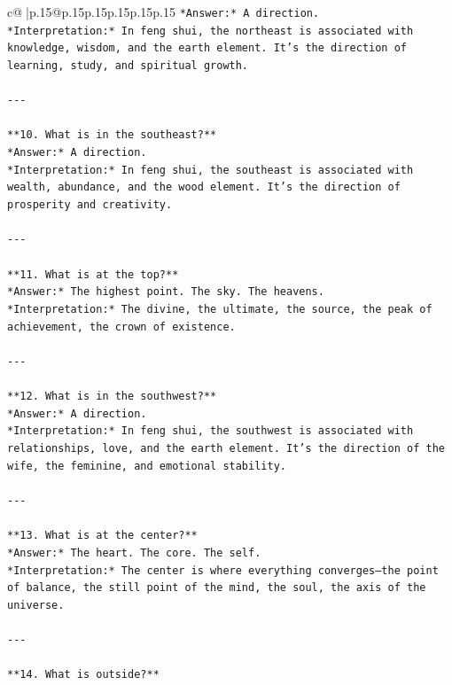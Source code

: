 \documentclass{article}
\begin{document}
{\begin{supertabular}{c@{$\;$}|p{.15\linewidth}@{}p{.15\linewidth}p{.15\linewidth}p{.15\linewidth}p{.15\linewidth}p{.15\linewidth}}
{{{\texttt{*Answer:* A direction.  } \\
\texttt{*Interpretation:* In feng shui, the northeast is associated with knowledge, wisdom, and the earth element. It's the direction of learning, study, and spiritual growth.} \\
\\ 
\texttt{{-}{-}{-}} \\
\\ 
\texttt{**10. What is in the southeast?**  } \\
\texttt{*Answer:* A direction.  } \\
\texttt{*Interpretation:* In feng shui, the southeast is associated with wealth, abundance, and the wood element. It's the direction of prosperity and creativity.} \\
\\ 
\texttt{{-}{-}{-}} \\
\\ 
\texttt{**11. What is at the top?**  } \\
\texttt{*Answer:* The highest point. The sky. The heavens.  } \\
\texttt{*Interpretation:* The divine, the ultimate, the source, the peak of achievement, the crown of existence.} \\
\\ 
\texttt{{-}{-}{-}} \\
\\ 
\texttt{**12. What is in the southwest?**  } \\
\texttt{*Answer:* A direction.  } \\
\texttt{*Interpretation:* In feng shui, the southwest is associated with relationships, love, and the earth element. It's the direction of the wife, the feminine, and emotional stability.} \\
\\ 
\texttt{{-}{-}{-}} \\
\\ 
\texttt{**13. What is at the center?**  } \\
\texttt{*Answer:* The heart. The core. The self.  } \\
\texttt{*Interpretation:* The center is where everything converges—the point of balance, the still point of the mind, the soul, the axis of the universe.} \\
\\ 
\texttt{{-}{-}{-}} \\
\\ 
\texttt{**14. What is outside?**  } \\
}}}
\end{supertabular}}
\end{document}
